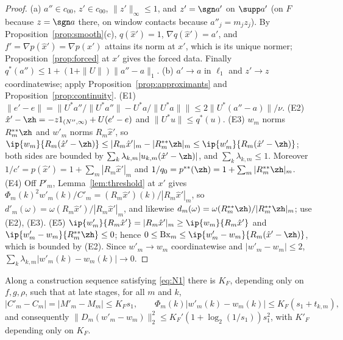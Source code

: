\begin{proof}
(a) $a''\in c_{00}$, $z'\in c_{00}$, $\|z'\|_\infty\le1$, and $z'=\sgn a'$ on
$\supp a'$ (on $F$ because $z=\sgn a$ there, on window contacts because
$a''_j=m_jz_j$).  By Proposition~\ref{prop:smooth}(c), $q(\hat x')=1$,
$\nabla q(\hat x')=a'$, and $f'=\nabla p(\hat x')=\nabla p(x')$ attains its
norm at $x'$, which is its unique normer; Proposition~\ref{prop:forced} at
$x'$ gives the forced data.  Finally $q^*(a'')\le1+(1+\|U\|)\|a''-a\|_1$.
(b) $a'\to a$ in $\ell_1$ and $z'\to z$ coordinatewise; apply
Proposition~\ref{prop:approximants} and Proposition~\ref{prop:continuity}.
(E1) $\|e'-e\|=\|U^*a''/\|U^*a''\|-U^*a/\|U^*a\|\|\le2\|U^*(a''-a)\|/\nu$.
(E2) $\hat x'-\zh=-z1_{(N'',\infty)}+U(e'-e)$ and $\|U^*u\|\le q^*(u)$.
(E3) $w_m$ norms $R_m^{**}\zh$ and $w'_m$ norms $R_m\hat x'$, so
$\ip{w_m}{R_m(\hat x'-\zh)}\le|R_m\hat x'|_m-|R^{**}_m\zh|_m\le
\ip{w'_m}{R_m(\hat x'-\zh)}$; both sides are bounded by
$\sum_k\lambda_{k,m}|u_{k,m}(\hat x'-\zh)|$, and $\sum_k\lambda_{k,m}\le1$.
Moreover $1/c'=p(\hat x')=1+\sum_m|R_m\hat x'|_m$ and $1/q_0=p^{**}(\zh)=
1+\sum_m|R^{**}_m\zh|_m$.
(E4) Off $P'_m$, Lemma~\ref{lem:threshold} at $x'$ gives
$\Phi_m(k)^2w'_m(k)/C'_m=(R_m\hat x')(k)/|R_m\hat x'|_m$, so
$d'_m(\omega)=\omega(R_m\hat x')/|R_m\hat x'|_m$, and likewise
$d_m(\omega)=\omega(R^{**}_m\zh)/|R^{**}_m\zh|_m$; use (E2), (E3).
(E5) $\ip{w'_m}{R_m\hat x'}=|R_m\hat x'|_m\ge\ip{w_m}{R_m\hat x'}$ and
$\ip{w'_m-w_m}{R_m^{**}\zh}\le0$; hence $0\le\mathrm{Bx}_m\le
\ip{w'_m-w_m}{R_m(\hat x'-\zh)}$, which is bounded by (E2).  Since
$w'_m\to w_m$ coordinatewise and $|w'_m-w_m|\le2$,
$\sum_k\lambda_{k,m}|w'_m(k)-w_m(k)|\to0$.
\end{proof}

\begin{lemma}\label{lem:F1}
Along a construction sequence satisfying \eqref{eq:N1} there is $K_F$,
depending only on $f,g,\rho$, such that at late stages, for all $m$ and $k$,
\[
 |C'_m-C_m|=|M'_m-M_m|\le K_Fs_1,\qquad
 \Phi_m(k)|w'_m(k)-w_m(k)|\le K_F(s_1+t_{k,m}),
\]
and consequently $\|D_m(w'_m-w_m)\|_2^2\le K_F'(1+\log_2(1/s_1))s_1^2$, with
$K'_F$ depending only on $K_F$.
\end{lemma}

